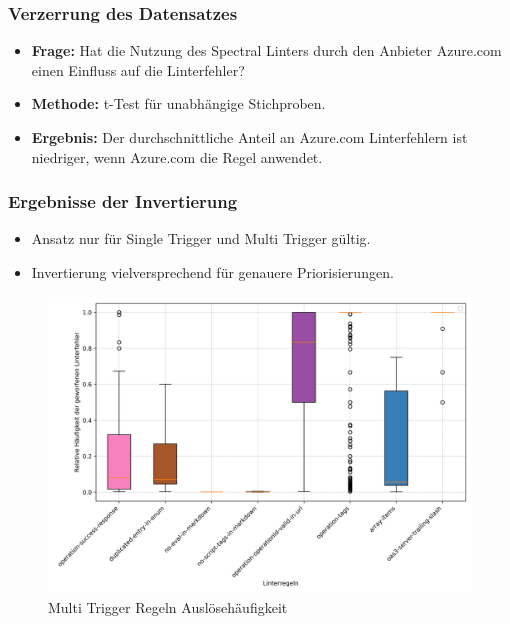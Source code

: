 \begin{frame}
  \frametitle{Verzerrung des Datensatzes}
  \begin{itemize}
    \item \textbf{Frage:} Hat die Nutzung des Spectral Linters durch den Anbieter Azure.com einen Einfluss auf die Linterfehler?
    \item \textbf{Methode:} t-Test für unabhängige Stichproben.
    \item \textbf{Ergebnis:} Der durchschnittliche Anteil an Azure.com Linterfehlern ist niedriger, wenn Azure.com die Regel anwendet. 
  \end{itemize}
\end{frame}

\begin{frame}
  \frametitle{Ergebnisse der Invertierung}
  \vspace{-0.4cm}
  \begin{itemize}
    \item Ansatz nur für Single Trigger und Multi Trigger gültig.
    \item Invertierung vielversprechend für genauere Priorisierungen.
  \end{itemize}
  \begin{figure}[htbp]
    \centering
    \includegraphics[width=0.75\linewidth]{img/defense-boxplotcleanmultitrigger.png}
    \caption{Multi Trigger Regeln Auslösehäufigkeit}
    \label{fig:boxplot}
  \end{figure}
\end{frame}

